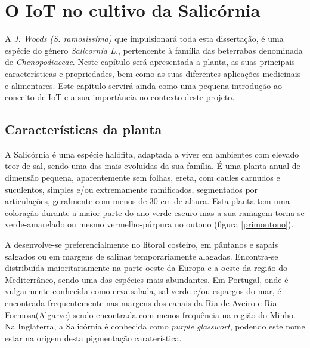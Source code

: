 
\chapter{O \acl{IoT} no cultivo da Salicórnia}

 A \sr \space \textit{J. Woods (S. ramosissima)}\cite{JoaoSilva} que impulsionará toda esta dissertação, é uma espécie do género \textit{Salicornia L.}, pertencente à família das beterrabas denominada de \textit{Chenopodiaceae}\cite{chenopodiaceae}.  Neste capítulo será apresentada a planta, as suas principais características e propriedades, bem como as suas diferentes aplicações medicinais e alimentares. Este capítulo servirá ainda como uma pequena introdução ao conceito de \ac{IoT} e a sua  importância no contexto deste projeto.


\section{Características da planta}


A Salicórnia é uma espécie halófita, adaptada a viver em ambientes com elevado teor de sal\cite{ferri}, sendo uma das mais evoluídas da sua família. É uma planta anual de dimensão pequena, aparentemente sem folhas, ereta, com caules carnudos e suculentos, simples e/ou extremamente ramificados, segmentados por articulações\cite{Silva2000}, geralmente com menos de 30 cm de altura\cite{overviewsal}. Esta planta tem uma coloração durante a maior parte do ano verde-escuro mas a sua ramagem torna-se  verde-amarelado ou mesmo vermelho-púrpura no outono\cite{Silva2000} (figura \ref{primoutono}).





A \sr \space desenvolve-se preferencialmente no litoral costeiro, em pântanos e sapais salgados ou em margens de salinas temporariamente alagadas. Encontra-se distribuída maioritariamente na parte oeste da Europa e a oeste da região do Mediterrâneo, sendo uma das espécies mais abundantes\cite{Figueroa1987}. Em Portugal, onde é vulgarmente conhecida como erva-salada, sal verde e/ou espargos do mar\cite{RaquelPinto}, é encontrada frequentemente nas margens dos canais da Ria de Aveiro e Ria Formosa(Algarve)\cite{RaquelPinto} sendo encontrada com menos frequência na região do Minho\cite{Silva2000}. 
Na Inglaterra, a Salicórnia é conhecida como \textit{purple glasswort}, podendo este nome estar na origem desta pigmentação caraterística\cite{Davy2001}. 




